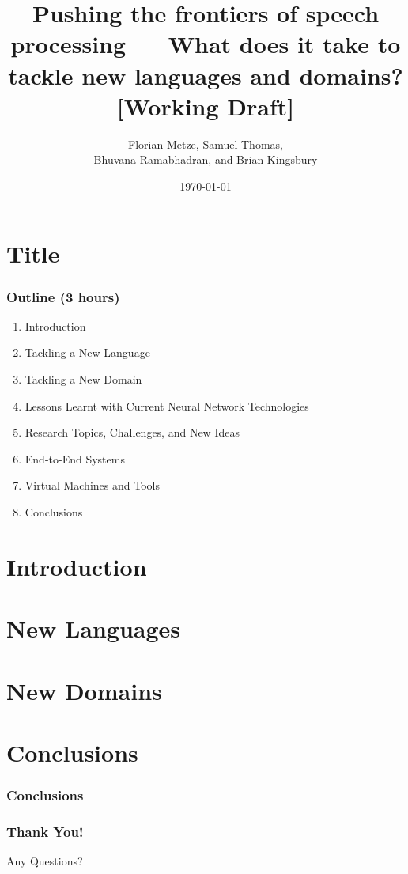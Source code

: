 \documentclass[12pt,xcolor=dvipsnames]{beamer}
\author{Florian Metze, Samuel Thomas, \\
  Bhuvana Ramabhadran, and Brian Kingsbury}
\title{{\color{Maroon} Pushing the frontiers of speech processing --- What does it take to tackle new languages and domains? [Working Draft]}}
\institute{Carnegie Mellon University and IBM}
\date{\today}
\begin{document}
\section{Title}

\begin{frame}
  \titlepage
\end{frame}



\begin{frame}
  \frametitle{Outline (3 hours)}
  \begin{enumerate}
  \item Introduction
  \item Tackling a New Language
  \item Tackling a New Domain
  \item Lessons Learnt with Current Neural Network Technologies
  \item Research Topics, Challenges, and New Ideas
  \item End-to-End Systems
  \item Virtual Machines and Tools
  \item Conclusions
  \end{enumerate}
\end{frame}

\section{Introduction}


\section{New Languages}


\section{New Domains}




\section{Conclusions}
\begin{frame}
  \frametitle{Conclusions}
\end{frame}

\begin{frame}
  \frametitle{Thank You!}
  \begin{center}
    {\color{Maroon}\Huge Any Questions?}
  \end{center}
\end{frame}


\end{document}
